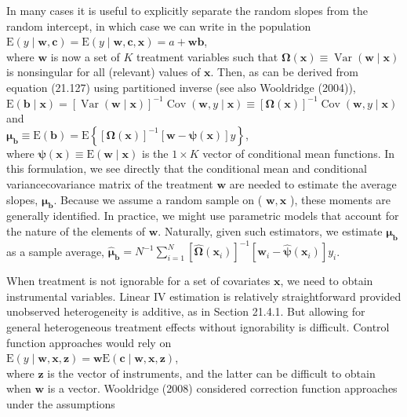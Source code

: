 \documentclass[10pt]{article}
\begin{document}
In many cases it is useful to explicitly separate the random slopes from the random intercept, in which case we can write in the population\\
$\mathrm{E}(y \mid \mathbf{w}, \mathbf{c})=\mathrm{E}(y \mid \mathbf{w}, \mathbf{c}, \mathbf{x})=a+\mathbf{w b}$,\\
where $\mathbf{w}$ is now a set of $K$ treatment variables such that $\boldsymbol{\Omega}(\mathbf{x}) \equiv \operatorname{Var}(\mathbf{w} \mid \mathbf{x})$ is nonsingular for all (relevant) values of $\mathbf{x}$. Then, as can be derived from equation (21.127) using partitioned inverse (see also Wooldridge (2004)),\\
$\mathrm{E}(\mathbf{b} \mid \mathbf{x})=[\operatorname{Var}(\mathbf{w} \mid \mathbf{x})]^{-1} \operatorname{Cov}(\mathbf{w}, y \mid \mathbf{x}) \equiv[\boldsymbol{\Omega}(\mathbf{x})]^{-1} \operatorname{Cov}(\mathbf{w}, y \mid \mathbf{x})$\\
and\\
$\boldsymbol{\mu}_{\mathbf{b}} \equiv \mathrm{E}(\mathbf{b})=\mathrm{E}\left\{[\boldsymbol{\Omega}(\mathbf{x})]^{-1}[\mathbf{w}-\boldsymbol{\psi}(\mathbf{x})] y\right\}$,\\
where $\boldsymbol{\psi}(\mathbf{x}) \equiv \mathrm{E}(\mathbf{w} \mid \mathbf{x})$ is the $1 \times K$ vector of conditional mean functions. In this formulation, we see directly that the conditional mean and conditional variancecovariance matrix of the treatment $\mathbf{w}$ are needed to estimate the average slopes, $\boldsymbol{\mu}_{\mathbf{b}}$. Because we assume a random sample on ( $\mathbf{w}, \mathbf{x}$ ), these moments are generally identified. In practice, we might use parametric models that account for the nature of the elements of $\mathbf{w}$. Naturally, given such estimators, we estimate $\boldsymbol{\mu}_{\mathbf{b}}$ as a sample average, $\hat{\boldsymbol{\mu}}_{\mathbf{b}}=N^{-1} \sum_{i=1}^{N}\left[\hat{\boldsymbol{\Omega}}\left(\mathbf{x}_{i}\right)\right]^{-1}\left[\mathbf{w}_{i}-\hat{\boldsymbol{\psi}}\left(\mathbf{x}_{i}\right)\right] y_{i}$.

When treatment is not ignorable for a set of covariates $\mathbf{x}$, we need to obtain instrumental variables. Linear IV estimation is relatively straightforward provided unobserved heterogeneity is additive, as in Section 21.4.1. But allowing for general heterogeneous treatment effects without ignorability is difficult. Control function approaches would rely on\\
$\mathrm{E}(y \mid \mathbf{w}, \mathbf{x}, \mathbf{z})=\mathbf{w} \mathrm{E}(\mathbf{c} \mid \mathbf{w}, \mathbf{x}, \mathbf{z})$,\\
where $\mathbf{z}$ is the vector of instruments, and the latter can be difficult to obtain when $\mathbf{w}$ is a vector. Wooldridge (2008) considered correction function approaches under the assumptions
\end{document}
